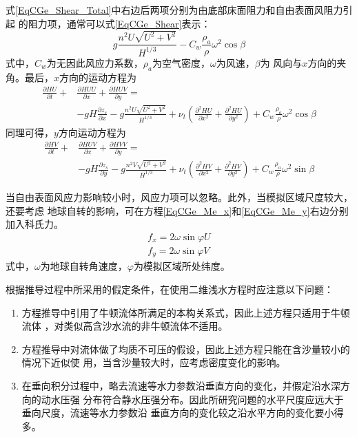 式\eqref{EqCGe_Shear_Total}中右边后两项分别为由底部床面阻力和自由表面风阻力引起
的阻力项，通常可以式\eqref{EqCGe_Shear}表示：
\begin{equation}
  g\frac{n^{2}U\sqrt{U^{2}+V^{2}}}{H^{1/3}}
  -
  C_{w}\frac{\rho_{a}}{\rho}\omega^{2}\cos\beta
  \label{EqCGe_Shear}
\end{equation}
式中，$C_{w}$为无因此风应力系数，$\rho_{a}$为空气密度，$\omega$为风速，$\beta$为
风向与$x$方向的夹角。最后，$x$方向的运动方程为
\begin{equation}
  \begin{aligned}
  \frac{\partial HU}{\partial t} +
  &\frac{\partial HUU}{\partial x} +
  \frac{\partial HUV}{\partial y} 
  =\\
  &-gH\frac{\partial  z_{s}}{\partial x}
  -g\frac{n^{2}U\sqrt{U^{2}+V^{2}}}{H^{1/3}}
  +
  \nu_{t}\left(
    \frac{\partial^{2}HU}{\partial x^{2}}+
    \frac{\partial^{2}HU}{\partial y^{2}}
\right)
  +C_{w}\frac{\rho_{a}}{\rho}\omega^{2}\cos\beta
  \end{aligned}
  \label{EqCGe_Me_x}
\end{equation}
同理可得，$y$方向运动方程为
\begin{equation}
  \begin{aligned}
  \frac{\partial HV}{\partial t} +
  &\frac{\partial HUV}{\partial x} +
  \frac{\partial HVV}{\partial y} 
  =\\
  &-gH\frac{\partial  z_{s}}{\partial y}
  -g\frac{n^{2}V\sqrt{U^{2}+V^{2}}}{H^{1/3}}
  +
  \nu_{t}\left(
    \frac{\partial^{2}HV}{\partial x^{2}}+
    \frac{\partial^{2}HV}{\partial y^{2}}
\right)
  +C_{w}\frac{\rho_{a}}{\rho}\omega^{2}\sin\beta
  \end{aligned}
  \label{EqCGe_Me_y}
\end{equation}

当自由表面风应力影响较小时，风应力项可以忽略。此外，当模拟区域尺度较大，还要考虑
地球自转的影响，可在方程\eqref{EqCGe_Me_x}和\eqref{EqCGe_Me_y}右边分别加入科氏力。
\begin{equation}
  \begin{aligned}
    f_x = 2\omega\sin\varphi U 
    \\
    f_y = 2\omega\sin\varphi V 
  \end{aligned}
\end{equation}
式中，$\omega$为地球自转角速度，$\varphi$为模拟区域所处纬度。

根据推导过程中所采用的假定条件，在使用二维浅水方程时应注意以下问题：
\begin{enumerate}
  \item 方程推导中引用了牛顿流体所满足的本构关系式，因此上述方程只适用于牛顿流体
，对类似高含沙水流的非牛顿流体不适用。
 \item 方程推导中对流体做了均质不可压的假设，因此上述方程只能在含沙量较小的情况下近似使
用，当含沙量较大时，应考虑密度变化的影响。
\item 在垂向积分过程中，略去流速等水力参数沿垂直方向的变化，并假定沿水深方向的动水压强
分布符合静水压强分布。因此所研究问题的水平尺度应远大于垂向尺度，流速等水力参数沿
垂直方向的变化较之沿水平方向的变化要小得多。
\end{enumerate}

